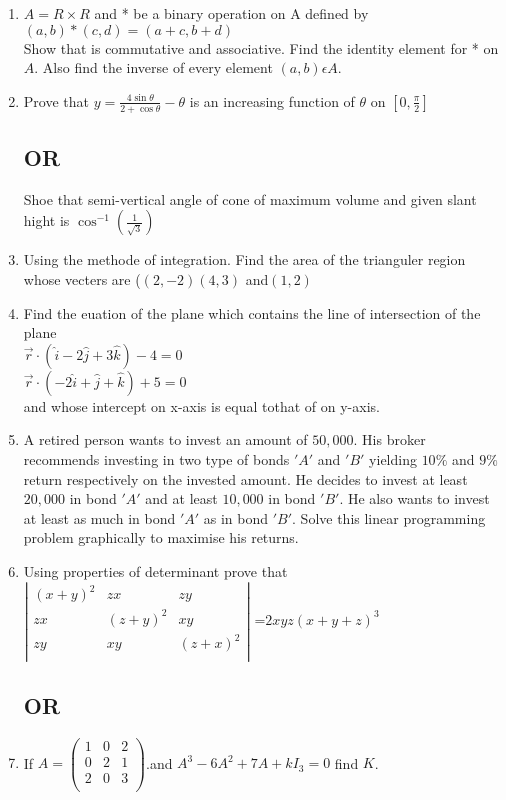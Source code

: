 \documentclass{article}
\begin{document}
\begin{enumerate}
\item $A=R \times R$ and * be a binary operation on A defined by $(a,b)*(c,d)=(a+c,b+d)$\\
	Show that is commutative and associative. Find the identity element for * on $A$. Also find the inverse of every element $(a, b) \epsilon A$.

\item Prove that $y=\frac{4\sin{\theta}}{2+\cos{\theta}}-\theta$ is an increasing function of $\theta$ on $[0,\frac{\pi}{2}]$
	\subsection *{\centering OR}
	
	Shoe that semi-vertical angle of cone of maximum volume and given slant hight is $\cos^{-1}(\frac{1}{\sqrt{3}})$
\item Using the methode of integration. Find the area of the trianguler region whose vecters are ($(2, -2)(4, 3)$ and$(1, 2)$

\item Find the euation of the plane which contains the line of intersection of the plane \\
	$\vec{r}\cdot(\hat{i}-2\hat{j}+3\hat{k})-4=0$\\
	$\vec{r}\cdot(-2\hat{i}+\hat{j}+\hat{k})+5=0$\\
	and whose intercept on x-axis is equal tothat of on y-axis.


	\item A retired person wants to invest an amount of \rupee $50,000$. His broker recommends investing in two type of bonds $'A'$ and $'B'$ yielding $10\%$ and $9\%$ return respectively on the invested amount. He decides to invest at least\rupee $20,000$ in bond $'A'$ and at least \rupee $10,000$ in bond $'B'$. He also wants to invest at least as much in bond $'A'$ as in bond $'B'$. Solve this linear programming problem graphically to maximise his returns.

	\item Using properties of determinant prove that \\
		$\left|
		\begin{matrix}
			(x+y)^{2} & zx &  zy\\
			zx & (z+y)^{2} & xy\\
			zy & xy & (z+x)^{2}\\
		\end{matrix}
		\right|$
		=$2xyz(x+y+z)^{3}$
           \subsection*{\centering  OR}

   \item  If $A=\left(
	   \begin{matrix}
		   1 & 0 & 2 \\
		   0  & 2 & 1 \\
		   2 & 0 & 3 \\

	   \end{matrix}
	   \right)$.and $A^3-6A^2+7A+kI_3=0$  find $K$.




\end{enumerate}
\end{document}
